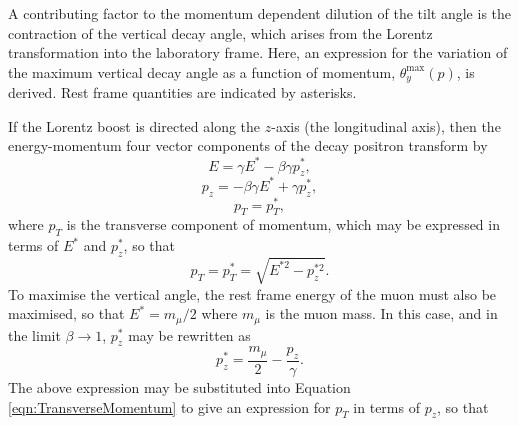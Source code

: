 \begin{appendices}
A contributing factor to the momentum dependent dilution of the tilt angle is the contraction of the vertical decay angle, which arises from the Lorentz transformation into the laboratory frame. Here, an expression for the variation of the maximum vertical decay angle as a function of momentum, $\theta_{y}^{\text{max}}(p)$, is derived. Rest frame quantities are indicated by asterisks. 

If the Lorentz boost is directed along the $z$-axis (the longitudinal axis), then the energy-momentum four vector components of the decay positron transform by
\begin{equation}
  E = \gamma E^{*} - \beta \gamma p_{z}^{*},
\end{equation}
%
\begin{equation}
  p_{z} = -\beta \gamma E^{*} + \gamma p_{z}^{*},
\end{equation}
%
\begin{equation}
  p_{T} = p_{T}^{*},
\end{equation}
%
%
where $p_{T}$ is the transverse component of momentum, which may be expressed in terms of $E^{*}$ and $p_{z}^{*}$, so that
%
\begin{equation}
  p_{T} = p_{T}^{*} = \sqrt{E^{*2} - p_{z}^{*2}}.
  \label{eqn:TransverseMomentum}
\end{equation}
%
To maximise the vertical angle, the rest frame energy of the muon must also be maximised, so that $E^{*}=m_{\mu}/2$ where $m_{\mu}$ is the muon mass. In this case, and in the limit $\beta\rightarrow1$, $p_{z}^{*}$ may be rewritten as 
%
\begin{equation}
  p_{z}^{*} = \frac{m_{\mu}}{2}-\frac{p_{z}}{\gamma}.
  \label{eqn:VerticalMomentumForMaxAngle}
\end{equation} 
%
The above expression may be substituted into Equation \ref{eqn:TransverseMomentum} to give an expression for $p_{T}$ in terms of $p_{z}$, so that

\end{appendices}
